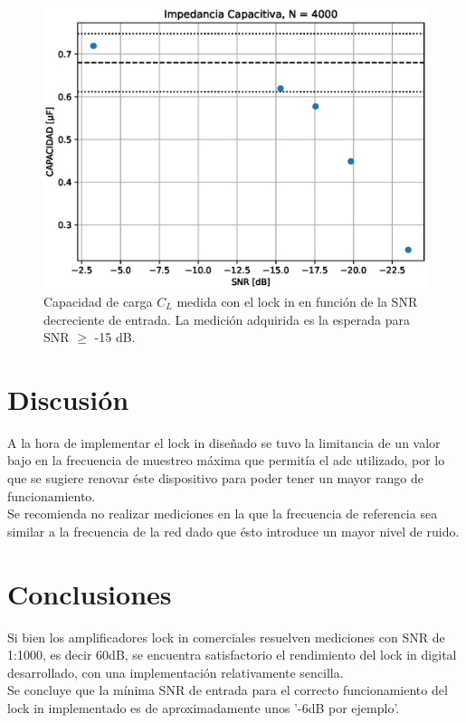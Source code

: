 \documentclass[11pt,a4paper]{extarticle}
\begin{document}
\begin{multicols}{2}
\begin{figure}[H]
	\centering
	\includegraphics[width=\linewidth]{Images/capacitor4000.eps}
	\caption{Capacidad de carga $C_L$ medida con 
	el lock in en función de la SNR decreciente de entrada.
	La medición adquirida es la esperada para SNR $\ge$ -15 dB.}
	\label{fig:CvsSNR}
\end{figure}


\section{Discusión}
A la hora de implementar el lock in diseñado se tuvo 
la limitancia de un valor bajo en la frecuencia de 
muestreo máxima que permitía el adc utilizado, por lo 
que se sugiere renovar éste 
dispositivo para poder tener un mayor 
rango de funcionamiento.\\

Se recomienda no realizar mediciones 
en la que la frecuencia de referencia sea 
similar a la frecuencia de la red dado que 
ésto introduce un mayor nivel de ruido.


\section{Conclusiones}

Si bien los amplificadores lock in comerciales resuelven 
mediciones con SNR de 1:1000, es decir 60dB,
 se encuentra satisfactorio 
el rendimiento del lock in digital desarrollado, con 
una implementación relativamente sencilla.\\

Se concluye que la mínima SNR de entrada para el 
correcto funcionamiento del lock in implementado es de 
aproximadamente unos '-6dB por ejemplo'.




\end{multicols}
\end{document}
